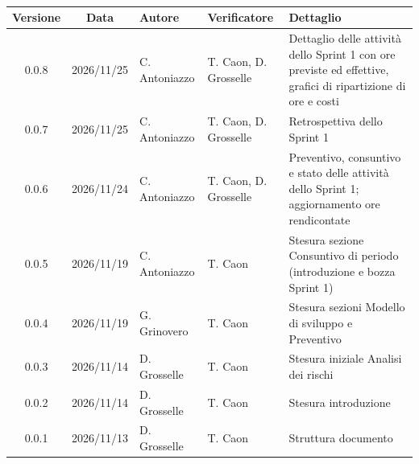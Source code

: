 \\[0.5cm]

\renewcommand{\arraystretch}{1.3}
\noindent\begin{tabularx}{\textwidth}{|c|c|>{\raggedright\arraybackslash}p{2.8cm}|>{\raggedright\arraybackslash}p{2.8cm}|X|}
    \hline
    \textbf{Versione} & \textbf{Data} & \textbf{Autore} & \textbf{Verificatore} & \textbf{Dettaglio} \\
    \hline
    0.0.8 & 2026/11/25 & C. Antoniazzo & T. Caon, D. Grosselle & Dettaglio delle attività dello Sprint 1 con ore previste ed effettive, grafici di ripartizione di ore e costi \\
    \hline
    0.0.7 & 2026/11/25 & C. Antoniazzo & T. Caon, D. Grosselle & Retrospettiva dello Sprint 1 \\
    \hline
    0.0.6 & 2026/11/24 & C. Antoniazzo & T. Caon, D. Grosselle & Preventivo, consuntivo e stato delle attività dello Sprint 1; aggiornamento ore rendicontate \\
    \hline
    0.0.5 & 2026/11/19 & C. Antoniazzo & T. Caon & Stesura sezione Consuntivo di periodo (introduzione e bozza Sprint 1) \\
    \hline
    0.0.4 & 2026/11/19 & G. Grinovero & T. Caon & Stesura sezioni Modello di sviluppo e Preventivo \\
    \hline
    0.0.3 & 2026/11/14 & D. Grosselle & T. Caon & Stesura iniziale Analisi dei rischi \\
    \hline
    0.0.2 & 2026/11/14 & D. Grosselle & T. Caon & Stesura introduzione \\
    \hline
    0.0.1 & 2026/11/13 & D. Grosselle & T. Caon & Struttura documento \\
    \hline
\end{tabularx}
\newpage
